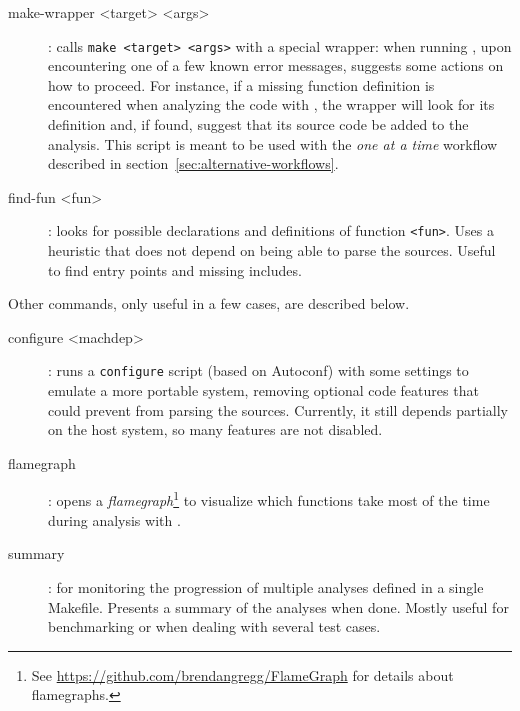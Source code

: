\begin{description}
\item[make-wrapper <target> <args>]: calls \texttt{make <target> <args>} with
  a special wrapper: when running \Value, upon encountering one of a few known
  error messages, suggests some actions on how to proceed.
  For instance, if a missing function definition is encountered when analyzing
  the code with \Value, the wrapper will look for its definition and, if found,
  suggest that its source code be added to the analysis. This script is meant
  to be used with the {\em one at a time} workflow described in
  section~\ref{sec:alternative-workflows}.
\item[find-fun <fun>]: looks for possible declarations and definitions
  of function \texttt{<fun>}. Uses a heuristic that does not depend on \FramaC
  being able to parse the sources. Useful to find entry points and missing
  includes.
\end{description}

Other commands, only useful in a few cases, are described below.

\begin{description}
\item[configure <machdep>]: runs a \texttt{configure}
  script (based on Autoconf) with some settings to emulate a more portable
  system, removing optional code features that could prevent \FramaC from
  parsing the sources. Currently, it still depends partially on the host system,
  so many features are not disabled.
\item[flamegraph]: opens a {\em flamegraph}\footnote{%
  See \url{https://github.com/brendangregg/FlameGraph} for details about
  flamegraphs.} to visualize which functions take most of the time
  during analysis with \Value.
\item[summary]: for monitoring the progression of multiple analyses defined
  in a single Makefile. Presents a summary of the analyses when done. Mostly
  useful for benchmarking or when dealing with several test cases.
\end{description}

